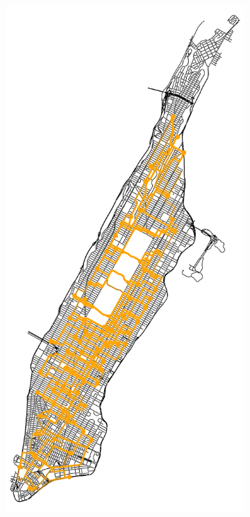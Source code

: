 \begin{figure}[t]
\begin{subfigure}[b]{0.35\textwidth}
		\caption{}
		\label{fig:nyc_rn_info}
	\end{subfigure}
	\hfill
	\begin{subfigure}[b]{0.35\textwidth}
		\centering
		\includegraphics[width=\textwidth]{assets/img/07_graph_based/new_york_vanilla_no_info.png}

\end{subfigure}
\end{figure}
